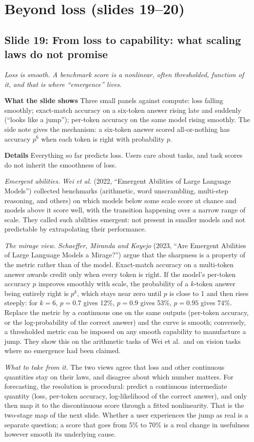 \documentclass[11pt,letterpaper]{article}
\newcommand{\slide}[3]{%
  \subsection[Slide #1: #2]{Slide #1: #2}%
  {\color{muted}\itshape #3\par}\medskip}
\newcommand{\para}[1]{\medskip\noindent\textbf{#1}\quad}
\begin{document}
\section{Beyond loss (slides 19--20)}

\slide{19}{From loss to capability: what scaling laws do not promise}{Loss is smooth. A benchmark score is a nonlinear, often thresholded, function of it, and that is where ``emergence'' lives.}

\para{What the slide shows} Three small panels against compute: loss falling smoothly; exact-match accuracy on a six-token answer rising late and suddenly (``looks like a jump''); per-token accuracy on the same model rising smoothly. The side note gives the mechanism: a six-token answer scored all-or-nothing has accuracy $p^6$ when each token is right with probability $p$.

\para{Details} Everything so far predicts loss. Users care about tasks, and task scores do not inherit the smoothness of loss.

\emph{Emergent abilities.} \emph{Wei et al.} (2022, ``Emergent Abilities of Large Language Models'') collected benchmarks (arithmetic, word unscrambling, multi-step reasoning, and others) on which models below some scale score at chance and models above it score well, with the transition happening over a narrow range of scale. They called such abilities emergent: not present in smaller models and not predictable by extrapolating their performance.

\emph{The mirage view.} \emph{Schaeffer, Miranda and Koyejo} (2023, ``Are Emergent Abilities of Large Language Models a Mirage?'') argue that the sharpness is a property of the metric rather than of the model. Exact-match accuracy on a multi-token answer awards credit only when every token is right. If the model's per-token accuracy $p$ improves smoothly with scale, the probability of a $k$-token answer being entirely right is $p^k$, which stays near zero until $p$ is close to 1 and then rises steeply: for $k=6$, $p=0.7$ gives 12\%, $p=0.9$ gives 53\%, $p=0.95$ gives 74\%. Replace the metric by a continuous one on the same outputs (per-token accuracy, or the log-probability of the correct answer) and the curve is smooth; conversely, a thresholded metric can be imposed on any smooth capability to manufacture a jump. They show this on the arithmetic tasks of Wei et al.\ and on vision tasks where no emergence had been claimed.

\emph{What to take from it.} The two views agree that loss and other continuous quantities stay on their laws, and disagree about which number matters. For forecasting, the resolution is procedural: predict a continuous intermediate quantity (loss, per-token accuracy, log-likelihood of the correct answer), and only then map it to the discontinuous score through a fitted nonlinearity. That is the two-stage map of the next slide. Whether a user experiences the jump as real is a separate question; a score that goes from 5\% to 70\% is a real change in usefulness however smooth its underlying cause.
\end{document}
